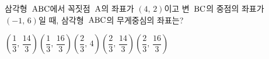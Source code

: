 삼각형~$\mathrm{ABC}$에서 꼭짓점~$\mathrm{A}$의 좌표가 $(4,\,2)$이고 변~$\mathrm{BC}$의 중점의 좌표가 $(-1,\,6)$일 때, 삼각형~$\mathrm{ABC}$의 무게중심의 좌표는?
\begin{choicesii}{$\left(\dfrac{1}{3},\,\dfrac{14}{3}\right)$}{$\left(\dfrac{1}{3},\,\dfrac{16}{3}\right)$}{$\left(\dfrac{2}{3},\,4\right)$}{$\left(\dfrac{2}{3},\,\dfrac{14}{3}\right)$}{$\left(\dfrac{2}{3},\,\dfrac{16}{3}\right)$}\end{choicesii}
